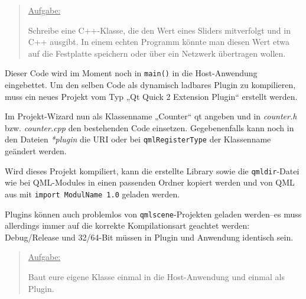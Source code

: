 \documentclass[a4paper]{article}
\begin{document}
\begin{quote}
\uline{Aufgabe:}

Schreibe eine C++-Klasse, die den Wert eines Sliders mitverfolgt und in C++ ausgibt. In einem echten Programm könnte man diesen Wert etwa auf die Festplatte speichern oder über ein Netzwerk übertragen wollen.
\end{quote}

Dieser Code wird im Moment noch in \verb~main()~ in die Host-Anwendung eingebettet. Um den selben Code als dynamisch ladbares Plugin zu kompilieren, muss ein neues Projekt vom Typ „Qt Quick 2 Extension Plugin“ erstellt werden.

Im Projekt-Wizard nun als Klassenname „Counter“
qt angeben und in \emph{counter.h} bzw. \emph{counter.cpp} den bestehenden Code einsetzen. Gegebenenfalls kann noch in den Dateien \emph{*plugin} die URI oder bei \verb~qmlRegisterType~ der Klassenname geändert werden.

Wird dieses Projekt kompiliert, kann die erstellte Library sowie die \verb~qmldir~-Datei wie bei QML-Modules in einen passenden Ordner kopiert werden und von QML aus mit \verb~import ModulName 1.0~ geladen werden.

Plugins können auch problemlos von \verb~qmlscene~-Projekten geladen werden--es muss allerdings immer auf die korrekte Kompilationsart geachtet werden: Debug/Release und 32/64-Bit müssen in Plugin und Anwendung identisch sein.

\begin{quote}
\uline{Aufgabe:}

Baut eure eigene Klasse einmal in die Host-Anwendung und einmal als Plugin.
\end{quote}
\end{document}
